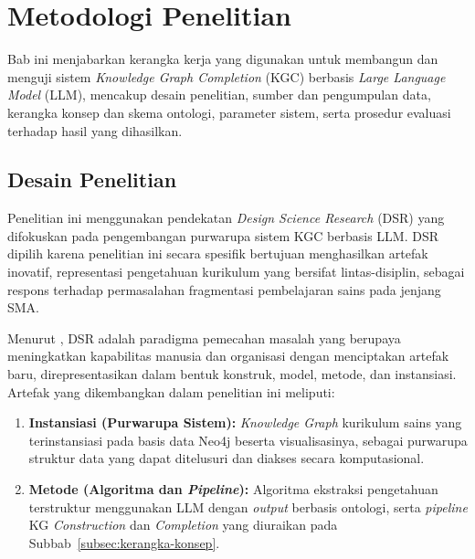 \documentclass[main]{subfiles}
\begin{document}
\ifSubfilesClassLoaded{}{\setcounter{chapter}{2}}

\chapter{Metodologi Penelitian}

Bab ini menjabarkan kerangka kerja yang digunakan untuk membangun dan
menguji sistem \textit{Knowledge Graph Completion} (KGC) berbasis
\textit{Large Language Model} (LLM), mencakup desain penelitian, sumber
dan pengumpulan data, kerangka konsep dan skema ontologi, parameter
sistem, serta prosedur evaluasi terhadap hasil yang dihasilkan.

\section{Desain Penelitian}

Penelitian ini menggunakan pendekatan \textit{Design Science Research}
(DSR) yang difokuskan pada pengembangan purwarupa sistem KGC berbasis
LLM. DSR dipilih karena penelitian ini secara spesifik bertujuan
menghasilkan artefak inovatif, representasi pengetahuan kurikulum yang
bersifat lintas-disiplin, sebagai respons terhadap permasalahan
fragmentasi pembelajaran sains pada jenjang SMA.

Menurut \textcite{hevner_design_2004}, DSR adalah paradigma pemecahan masalah
yang berupaya meningkatkan kapabilitas manusia dan organisasi dengan
menciptakan artefak baru, direpresentasikan dalam bentuk konstruk,
model, metode, dan instansiasi. Artefak yang dikembangkan dalam
penelitian ini meliputi:

\begin{enumerate}
  \item \textbf{Instansiasi (Purwarupa Sistem):} \textit{Knowledge Graph}
        kurikulum sains yang terinstansiasi pada basis data Neo4j beserta
        visualisasinya, sebagai purwarupa struktur data yang dapat ditelusuri
        dan diakses secara komputasional.
  \item \textbf{Metode (Algoritma dan \textit{Pipeline}):} Algoritma
        ekstraksi pengetahuan terstruktur menggunakan LLM dengan
        \textit{output} berbasis ontologi, serta \textit{pipeline} KG
        \textit{Construction} dan \textit{Completion} yang diuraikan pada
        Subbab~\ref{subsec:kerangka-konsep}.
\end{enumerate}
\end{document}
